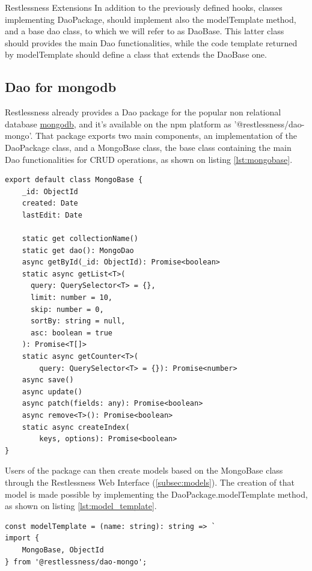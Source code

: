 \begin{chapter}{Restlessness Extensions}
    In addition to the previously defined hooks, classes implementing DaoPackage,
    should implement also the modelTemplate method, and a base dao class, to which
    we will refer to as DaoBase. This latter class should provides the main Dao
    functionalities, while the code template returned by modelTemplate should define
    a class that extends the DaoBase one.

    \subsection{Dao for mongodb}
    Restlessness already provides a Dao package for the popular non relational
    database \href{https://www.mongodb.com/}{mongodb}, and it's available on the
    npm platform as '@restlessness/dao-mongo'.
    That package exports two main components, an implementation of the DaoPackage
    class, and a MongoBase class, the base class containing the main Dao
    functionalities for CRUD operations, as shown on listing \ref{lst:mongobase}.

    \begin{lstlisting}[caption=MongoBase class definition, label={lst:mongobase}]
export default class MongoBase {
    _id: ObjectId
    created: Date
    lastEdit: Date

    static get collectionName()
    static get dao(): MongoDao
    async getById(_id: ObjectId): Promise<boolean>
    static async getList<T>(
      query: QuerySelector<T> = {},
      limit: number = 10,
      skip: number = 0,
      sortBy: string = null,
      asc: boolean = true
    ): Promise<T[]>
    static async getCounter<T>(
        query: QuerySelector<T> = {}): Promise<number>
    async save()
    async update()
    async patch(fields: any): Promise<boolean>
    async remove<T>(): Promise<boolean>
    static async createIndex(
        keys, options): Promise<boolean>
}
    \end{lstlisting}

    Users of the package can then create models based on the MongoBase class through
    the Restlessness Web Interface (\ref{subsec:models}).
    The creation of that model is made possible by implementing the DaoPackage.modelTemplate
    method, as shown on listing \ref{lst:model_template}.

    \begin{lstlisting}[caption=modelTemplate function definition, label={lst:model_template}]
const modelTemplate = (name: string): string => `
import {
    MongoBase, ObjectId
} from '@restlessness/dao-mongo';


\end{lstlisting}
\end{chapter}
